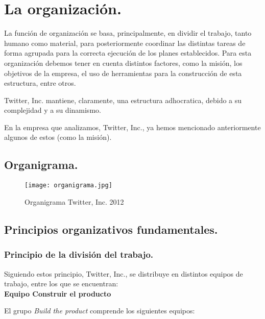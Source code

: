 
\section{La organización.}

La función de organización se basa, principalmente, en dividir el trabajo, tanto humano como material, para posteriormente coordinar las distintas tareas de forma agrupada para la correcta ejecución de los planes establecidos. Para esta organización debemos tener en cuenta distintos factores, como la misión, los objetivos de la empresa, el uso de herramientas para la construcción de esta estructura, entre otros.

Twitter, Inc. mantiene, claramente, una estructura adhocratica, debido a su complejidad y a su dinamismo.

En la empresa que analizamos, Twitter, Inc., ya hemos mencionado anteriormente algunos de estos (como la misión).

\newpage
\subsection{Organigrama.}

\begin{figure}[!htb]
\centering
\texttt{[image: organigrama.jpg]}
\caption{\label{fig:frog}Organigrama Twitter, Inc. 2012}
\end{figure}



\subsection{Principios organizativos fundamentales.}

\subsubsection{Principio de la división del trabajo.}

Siguiendo estos principio, Twitter, Inc., se distribuye en distintos equipos de trabajo, entre los que se encuentran:\\

\textbf{Equipo Construir el producto}

El grupo \textit{Build the product} comprende los siguientes equipos:

